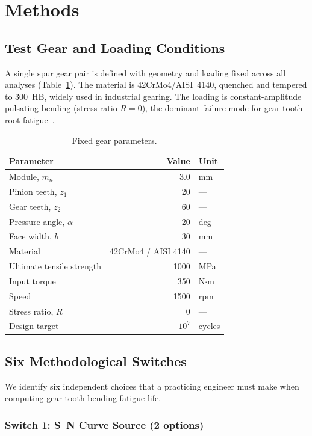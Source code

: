 \documentclass[12pt,a4paper]{article}
\begin{document}
\section{Methods}
\label{sec:methods}

\subsection{Test Gear and Loading Conditions}

A single spur gear pair is defined with geometry and loading fixed
across all analyses (Table~\ref{tab:gear}). The material is
42CrMo4/AISI~4140, quenched and tempered to 300~HB, widely used in
industrial gearing. The loading is constant-amplitude pulsating bending
(stress ratio $R=0$), the dominant failure mode for gear tooth root
fatigue~\cite{iso6336}.

\begin{table}[h]
\centering
\caption{Fixed gear parameters.}
\label{tab:gear}
\begin{tabular}{lrl}
\toprule
Parameter & Value & Unit \\
\midrule
Module, $m_n$ & 3.0 & mm \\
Pinion teeth, $z_1$ & 20 & --- \\
Gear teeth, $z_2$ & 60 & --- \\
Pressure angle, $\alpha$ & 20 & deg \\
Face width, $b$ & 30 & mm \\
Material & 42CrMo4 / AISI 4140 & --- \\
Ultimate tensile strength & 1000 & MPa \\
Input torque & 350 & N$\cdot$m \\
Speed & 1500 & rpm \\
Stress ratio, $R$ & 0 & --- \\
Design target & $10^7$ & cycles \\
\bottomrule
\end{tabular}
\end{table}

\subsection{Six Methodological Switches}

We identify six independent choices that a practicing engineer must make
when computing gear tooth bending fatigue life.

\subsubsection{Switch 1: S--N Curve Source (2 options)}
\end{document}
